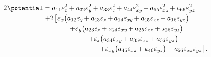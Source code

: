 \nopagebreak\vspace{-0.2em}
\begin{equation}\label{elasticenergylooongcartesian}
\begin{gathered}
\hspace{-5em}
2 \hspace{.1ex} \potential
= a_{11} \varepsilon^2_{x} \hspace{-0.1ex}
+ a_{22} \varepsilon^2_{y} \hspace{-0.1ex}
+ a_{33} \varepsilon^2_{z} \hspace{-0.1ex}
+ a_{44} \varepsilon^2_{xy} \hspace{-0.2ex}
+ a_{55} \varepsilon^2_{xz} \hspace{-0.2ex}
+ a_{66} \varepsilon^2_{yz}
\\[-0.1em]
%
\hspace{.2em}
+ 2 \hspace{.2ex} \bigl[ \hspace{.1ex}
\varepsilon_{x} \hspace{.1ex}
\bigl( a_{12} \varepsilon_{y} \hspace{-0.2ex}
+ a_{13} \varepsilon_{z} \hspace{-0.2ex}
+ a_{14} \varepsilon_{xy} \hspace{-0.2ex}
+ a_{15} \varepsilon_{xz} \hspace{-0.2ex}
+ a_{16} \varepsilon_{yz} \bigr)
\\[-0.1em]
%
\hspace{3em}
+ \varepsilon_{y} \hspace{.1ex} \bigl(
a_{23} \varepsilon_{z} \hspace{-0.2ex}
+ a_{24} \varepsilon_{xy} \hspace{-0.2ex}
+ a_{25} \varepsilon_{xz} \hspace{-0.2ex}
+ a_{26} \varepsilon_{yz} \bigr)
\\[-0.1em]
%
\hspace{5em}
+ \varepsilon_{z} \bigl(
a_{34} \varepsilon_{xy} \hspace{-0.2ex}
+ a_{35} \varepsilon_{xz} \hspace{-0.2ex}
+ a_{36} \varepsilon_{yz} \bigr)
\\[-0.1em]
%
\hspace{11em}
+ \varepsilon_{xy} \hspace{.1ex} \bigl(
a_{45} \varepsilon_{xz} \hspace{-0.2ex}
+ a_{46} \varepsilon_{yz} \bigr) \hspace{-0.11ex}
+ a_{56} \varepsilon_{xz} \varepsilon_{yz}
\hspace{.1ex} \bigr]
\hspace{.1ex}
.
\end{gathered}
\end{equation}

